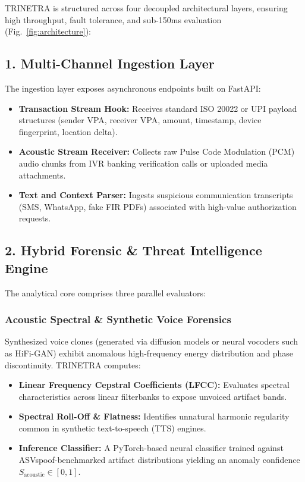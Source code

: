 \documentclass[10pt,journal,compsoc]{IEEEtran}
\begin{document}
TRINETRA is structured across four decoupled architectural layers, ensuring high throughput, fault tolerance, and sub-150ms evaluation (Fig.~\ref{fig:architecture}):

\subsection{1. Multi-Channel Ingestion Layer}
The ingestion layer exposes asynchronous endpoints built on FastAPI:
\begin{itemize}
    \item \textbf{Transaction Stream Hook:} Receives standard ISO 20022 or UPI payload structures (sender VPA, receiver VPA, amount, timestamp, device fingerprint, location delta).
    \item \textbf{Acoustic Stream Receiver:} Collects raw Pulse Code Modulation (PCM) audio chunks from IVR banking verification calls or uploaded media attachments.
    \item \textbf{Text and Context Parser:} Ingests suspicious communication transcripts (SMS, WhatsApp, fake FIR PDFs) associated with high-value authorization requests.
\end{itemize}

\subsection{2. Hybrid Forensic \& Threat Intelligence Engine}
The analytical core comprises three parallel evaluators:

\subsubsection{Acoustic Spectral \& Synthetic Voice Forensics}
Synthesized voice clones (generated via diffusion models or neural vocoders such as HiFi-GAN) exhibit anomalous high-frequency energy distribution and phase discontinuity. TRINETRA computes:
\begin{itemize}
    \item \textbf{Linear Frequency Cepstral Coefficients (LFCC):} Evaluates spectral characteristics across linear filterbanks to expose unvoiced artifact bands.
    \item \textbf{Spectral Roll-Off \& Flatness:} Identifies unnatural harmonic regularity common in synthetic text-to-speech (TTS) engines.
    \item \textbf{Inference Classifier:} A PyTorch-based neural classifier trained against ASVspoof-benchmarked artifact distributions yielding an anomaly confidence $S_{\text{acoustic}} \in [0, 1]$.
\end{itemize}
\end{document}
